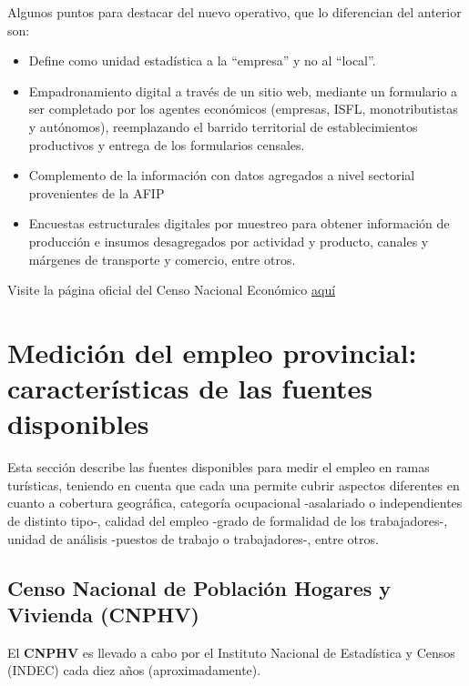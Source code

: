 \documentclass[
  openany]{book}
\providecommand{\tightlist}{%
  \setlength{\itemsep}{0pt}\setlength{\parskip}{0pt}}
\begin{document}
Algunos puntos para destacar del nuevo operativo, que lo diferencian del anterior son:

\begin{itemize}
\tightlist
\item
  Define como unidad estadística a la ``empresa'' y no al ``local''.
\item
  Empadronamiento digital a través de un sitio web, mediante un formulario a ser completado por los agentes económicos (empresas, ISFL, monotributistas y autónomos), reemplazando el barrido territorial de establecimientos productivos y entrega de los formularios censales.
\item
  Complemento de la información con datos agregados a nivel sectorial provenientes de la AFIP
\item
  Encuestas estructurales digitales por muestreo para obtener información de producción e insumos desagregados por actividad y producto, canales y márgenes de transporte y comercio, entre otros.
\end{itemize}

Visite la página oficial del Censo Nacional Económico \href{https://censoeconomico.indec.gob.ar/}{aquí}

\hypertarget{mediciuxf3n-del-empleo-provincial-caracteruxedsticas-de-las-fuentes-disponibles}{%
\section{Medición del empleo provincial: características de las fuentes disponibles}\label{mediciuxf3n-del-empleo-provincial-caracteruxedsticas-de-las-fuentes-disponibles}}

Esta sección describe las fuentes disponibles para medir el empleo en ramas turísticas, teniendo en cuenta que cada una permite cubrir aspectos diferentes en cuanto a cobertura geográfica, categoría ocupacional -asalariado o independientes de distinto tipo-, calidad del empleo -grado de formalidad de los trabajadores-, unidad de análisis -puestos de trabajo o trabajadores-, entre otros.

\hypertarget{censo-nacional-de-poblaciuxf3n-hogares-y-vivienda-cnphv}{%
\subsection{Censo Nacional de Población Hogares y Vivienda (CNPHV)}\label{censo-nacional-de-poblaciuxf3n-hogares-y-vivienda-cnphv}}

El \textbf{CNPHV} es llevado a cabo por el Instituto Nacional de Estadística y Censos (INDEC) cada diez años (aproximadamente).
\end{document}
